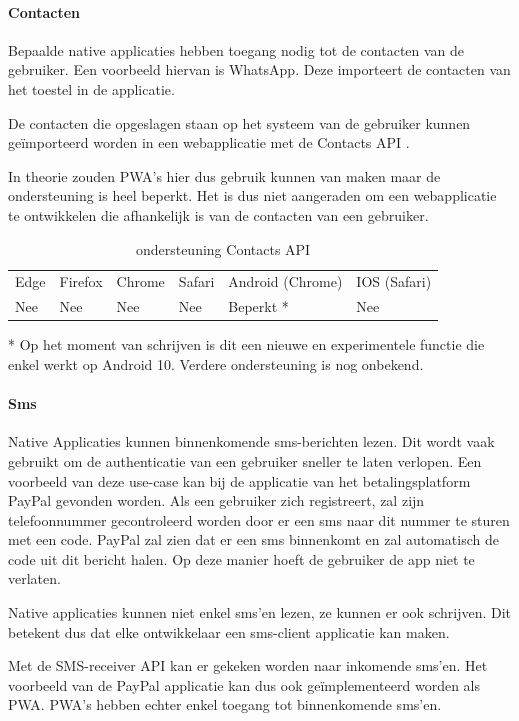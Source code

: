 \paragraph{Contacten}
Bepaalde native applicaties hebben toegang nodig tot de contacten van de gebruiker. Een voorbeeld hiervan is WhatsApp. Deze importeert de contacten van het toestel in de applicatie.

De contacten die opgeslagen staan op het systeem van de gebruiker kunnen geïmporteerd worden in een webapplicatie met de Contacts API \autocite{Tibbett2020}.

In theorie zouden PWA’s hier dus gebruik kunnen van maken maar de ondersteuning is heel beperkt. Het is dus niet aangeraden om een webapplicatie te ontwikkelen die afhankelijk is van de contacten van een gebruiker.

\begin{table}[H]
	\centering
	\begin{tabular}{llllll}
		Edge & Firefox & Chrome & Safari & Android (Chrome) & IOS (Safari) \\
		Nee   & Nee      &  Nee     & Nee     & Beperkt *               & Nee          
	\end{tabular}	
	\caption{ondersteuning Contacts API}{ * Op het moment van schrijven is dit een nieuwe en experimentele functie die enkel werkt op 
	Android 10. Verdere ondersteuning is nog onbekend.}
\end{table}	


\paragraph{Sms}
Native Applicaties kunnen binnenkomende sms-berichten lezen. Dit wordt vaak gebruikt om de authenticatie van een gebruiker sneller te laten verlopen. Een voorbeeld van deze use-case kan bij de applicatie van het betalingsplatform PayPal gevonden worden. Als een gebruiker zich registreert, zal zijn telefoonnummer gecontroleerd worden door er een sms naar dit nummer te sturen met een code. PayPal zal zien dat er een sms binnenkomt en zal automatisch de code uit dit bericht halen. Op deze manier hoeft de gebruiker de app niet te verlaten.

Native applicaties kunnen niet enkel sms’en lezen, ze kunnen er ook schrijven. Dit betekent dus dat elke ontwikkelaar een sms-client applicatie kan maken.

Met de SMS-receiver API \autocite{Fullea2020} kan er gekeken worden naar inkomende sms’en. Het voorbeeld van de PayPal applicatie kan dus ook geïmplementeerd worden als PWA. PWA’s hebben echter enkel toegang tot binnenkomende sms’en. 

